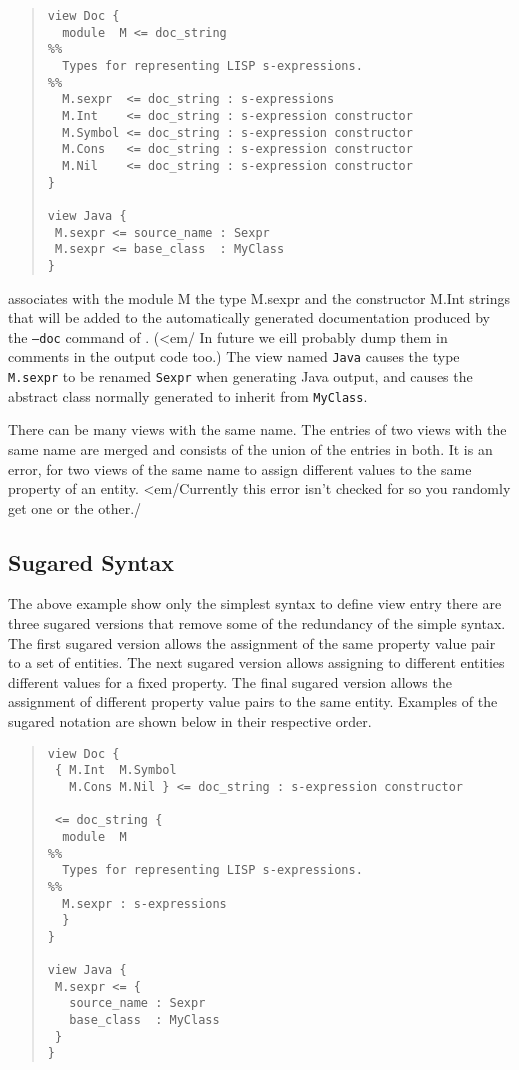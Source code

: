 \begin{quote}\begin{lstlisting}[language=ASDL]
view Doc {
  module  M <= doc_string
%%
  Types for representing LISP s-expressions.
%%
  M.sexpr  <= doc_string : s-expressions 
  M.Int    <= doc_string : s-expression constructor
  M.Symbol <= doc_string : s-expression constructor
  M.Cons   <= doc_string : s-expression constructor
  M.Nil    <= doc_string : s-expression constructor
}

view Java {
 M.sexpr <= source_name : Sexpr
 M.sexpr <= base_class  : MyClass
}
\end{lstlisting}\end{quote}%

associates with the module M the type M.sexpr and the constructor M.Int
strings that will be added to the automatically generated documentation
produced by the \texttt{--doc} command of \asdlgen{}.
(<em/ In future we eill probably dump them in comments in the output code too.)
The view named \lstinline[language=ASDL]!Java! causes the type
\lstinline[language=ASDL]!M.sexpr! to be renamed \lstinline[language=ASDL]!Sexpr! when
generating Java output, and causes the abstract class normally generated to
inherit from \lstinline[language=ASDL]!MyClass!. 

There can be many views with the same name. The entries of two views
with the same name are merged and consists of the union of the entries
in both. It is an error, for two views of the same name to assign
different values to the same property of an entity. <em/Currently
this error isn't checked for so you randomly get one or the other./

\subsection{Sugared Syntax}
The above example show only the simplest syntax to define view entry there are
three sugared versions that remove some of the redundancy of the simple
syntax. The first sugared version allows the assignment of the same
property value pair to a set of entities. The next sugared version allows
assigning to different entities different values for a fixed property.
The final sugared version allows the assignment of different property
value pairs to the same entity. Examples of the sugared notation are shown
below in their respective order.
\begin{quote}\begin{lstlisting}[language=ASDL]
view Doc {
 { M.Int  M.Symbol  
   M.Cons M.Nil } <= doc_string : s-expression constructor

 <= doc_string {
  module  M 
%%
  Types for representing LISP s-expressions.
%%
  M.sexpr : s-expressions 
  }
}

view Java {
 M.sexpr <= {
   source_name : Sexpr
   base_class  : MyClass
 }
}
\end{lstlisting}\end{quote}%
